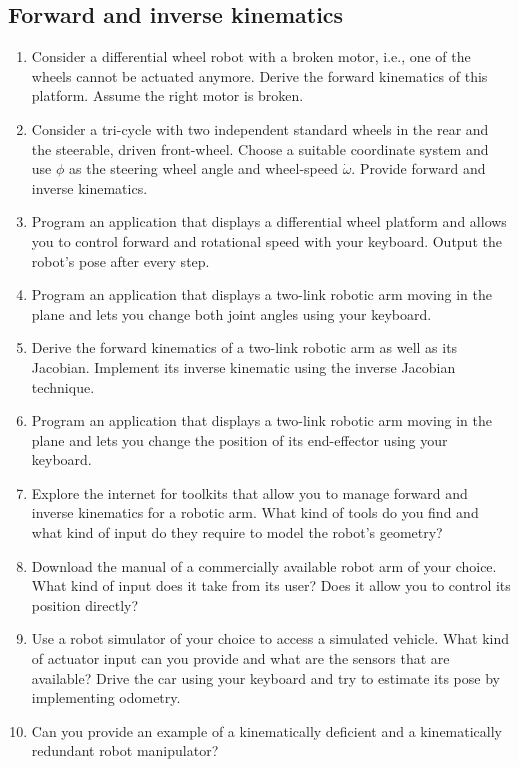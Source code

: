 \subsection*{Forward and inverse kinematics}
\begin{enumerate}
\item Consider a differential wheel robot with a broken motor, i.e., one of the wheels cannot be actuated anymore. Derive the forward kinematics of this platform. Assume the right motor is broken.
\item Consider a tri-cycle with two independent standard wheels in the rear and the steerable, driven front-wheel. Choose a suitable coordinate system and use $\phi$ as the steering wheel angle and wheel-speed $\dot{\omega}$. Provide forward and inverse kinematics.
\item Program an application that displays a differential wheel platform and allows you to control forward and rotational speed with your keyboard. Output the robot's pose after every step.
\item Program an application that displays a two-link robotic arm moving in the plane and lets you change both joint angles using your keyboard.
\item Derive the forward kinematics of a two-link robotic arm as well as its Jacobian. Implement its inverse kinematic using the inverse Jacobian technique.
\item Program an application that displays a two-link robotic arm moving in the plane and lets you change the position of its end-effector using your keyboard.
\item Explore the internet for toolkits that allow you to manage forward and inverse kinematics for a robotic arm. What kind of tools do you find and what kind of input do they require to model the robot's geometry?
\item Download the manual of a commercially available robot arm of your choice. What kind of input does it take from its user? Does it allow you to control its position directly?
\item Use a robot simulator of your choice to access a simulated vehicle. What kind of actuator input can you provide and what are the sensors that are available? Drive the car using your keyboard and try to estimate its pose by implementing odometry.
\item Can you provide an example of a kinematically deficient and a kinematically redundant robot manipulator?
\end{enumerate}
\normalsize

